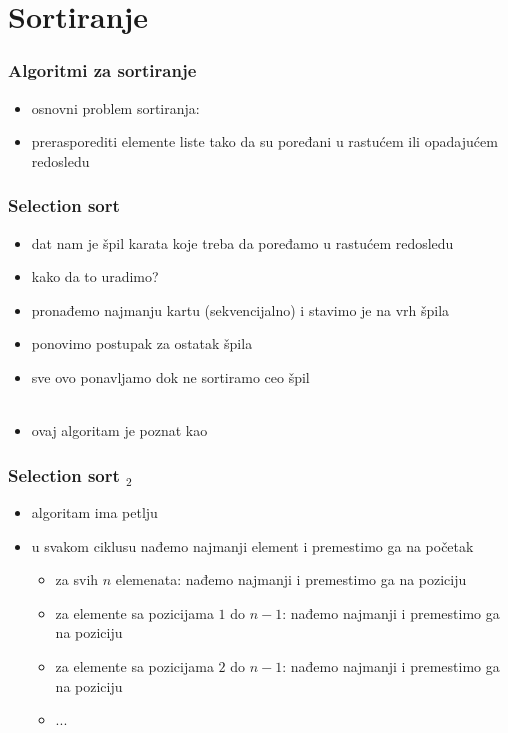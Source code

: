\documentclass[utf8,compress,aspectratio=169]{beamer}
\begin{document}
\section{Sortiranje}

\begin{frame}[fragile]
  \frametitle{Algoritmi za sortiranje}
  \begin{itemize}
    \item osnovni problem sortiranja:
    \item prerasporediti elemente liste tako da su poređani u rastućem ili opadajućem redosledu
  \end{itemize}
\end{frame}

\begin{frame}[fragile]
  \frametitle{Selection sort}
  \begin{itemize}
    \item dat nam je špil karata koje treba da poređamo u rastućem redosledu
    \item kako da to uradimo?
    \item pronađemo najmanju kartu (sekvencijalno) i stavimo je na vrh špila
    \item ponovimo postupak za ostatak špila
    \item sve ovo ponavljamo dok ne sortiramo ceo špil \\ \ \\
    \item ovaj algoritam je poznat kao 
  \end{itemize}
\end{frame}

\begin{frame}[fragile]
  \frametitle{Selection sort $_2$}
  \begin{itemize}
    \item algoritam ima petlju
    \item u svakom ciklusu nađemo najmanji element i premestimo ga na početak
  \begin{itemize}
    \item za svih $n$ elemenata: nađemo najmanji i premestimo ga na  poziciju
    \item za elemente sa pozicijama $1$ do $n-1$: nađemo najmanji i premestimo ga na  poziciju
    \item za elemente sa pozicijama $2$ do $n-1$: nađemo najmanji i premestimo ga na  poziciju
    \item ...
  \end{itemize}
  \end{itemize}
\end{frame}
\end{document}
